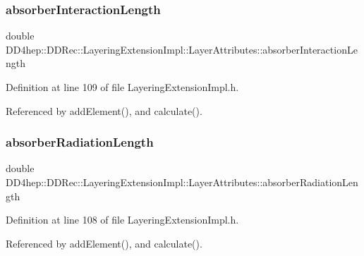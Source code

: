 \subsubsection{\texorpdfstring{absorber\+Interaction\+Length}{absorberInteractionLength}}
{\footnotesize\ttfamily double D\+D4hep\+::\+D\+D\+Rec\+::\+Layering\+Extension\+Impl\+::\+Layer\+Attributes\+::absorber\+Interaction\+Length}



Definition at line 109 of file Layering\+Extension\+Impl.\+h.



Referenced by add\+Element(), and calculate().

\hypertarget{struct_d_d4hep_1_1_d_d_rec_1_1_layering_extension_impl_1_1_layer_attributes_ab8e487c7c57cf4ad23dc81eb85189d96}{}\label{struct_d_d4hep_1_1_d_d_rec_1_1_layering_extension_impl_1_1_layer_attributes_ab8e487c7c57cf4ad23dc81eb85189d96} 
\subsubsection{\texorpdfstring{absorber\+Radiation\+Length}{absorberRadiationLength}}
{\footnotesize\ttfamily double D\+D4hep\+::\+D\+D\+Rec\+::\+Layering\+Extension\+Impl\+::\+Layer\+Attributes\+::absorber\+Radiation\+Length}



Definition at line 108 of file Layering\+Extension\+Impl.\+h.



Referenced by add\+Element(), and calculate().

\hypertarget{struct_d_d4hep_1_1_d_d_rec_1_1_layering_extension_impl_1_1_layer_attributes_a36c95a802bff564fab44f6c0cfdfbda3}{}\label{struct_d_d4hep_1_1_d_d_rec_1_1_layering_extension_impl_1_1_layer_attributes_a36c95a802bff564fab44f6c0cfdfbda3} 
